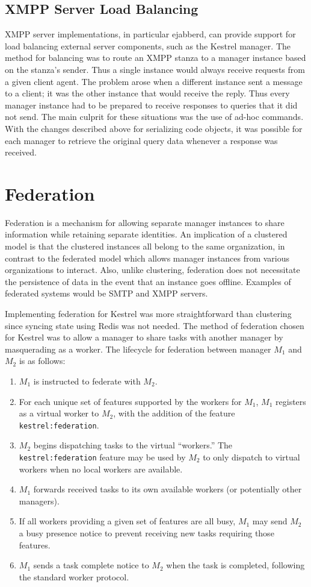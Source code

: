 \subsection{XMPP Server Load Balancing}
XMPP server implementations, in particular ejabberd, can provide support for load
balancing external server components, such as the Kestrel manager. The method for
balancing was to route an XMPP stanza to a manager instance based on the stanza's
sender. Thus a single instance would always receive requests from a given client agent.
The problem arose when a different instance sent a message to a client; it was the
other instance that would receive the reply. Thus every manager instance had to be
prepared to receive responses to queries that it did not send. The main culprit
for these situations was the use of ad-hoc commands. With the changes described above
for serializing code objects, it was possible for each manager to retrieve the
original query data whenever a response was received.

\section{Federation}
Federation is a mechanism for allowing separate manager instances to share
information while retaining separate identities. An implication of a clustered
model is that the clustered instances all belong to the same organization, in
contrast to the federated model which allows manager instances from various
organizations to interact. Also, unlike clustering, federation does not
necessitate the persistence of data in the event that an instance goes
offline. Examples of federated systems would be SMTP and XMPP servers.

Implementing federation for Kestrel was more straightforward than clustering
since syncing state using Redis was not needed. The method of federation chosen
for Kestrel was to allow a manager to share tasks with another manager by
masquerading as a worker. The lifecycle for federation between manager $M_1$ and
$M_2$ is as follows:
\begin{enumerate}
\item $M_1$ is instructed to federate with $M_2$.
\item For each unique set of features supported by the workers for $M_1$,
$M_1$ registers as a virtual worker to $M_2$, with the addition of the feature
\texttt{kestrel:federation}.
\item $M_2$ begins dispatching tasks to the virtual ``workers.'' The
\texttt{kestrel:federation} feature may be used by $M_2$ to only dispatch to
virtual workers when no local workers are available.
\item $M_1$ forwards received tasks to its own available workers (or potentially other managers).
\item If all workers providing a given set of features are all busy, $M_1$ may
send $M_2$ a busy presence notice to prevent receiving new tasks requiring those
features.
\item $M_1$ sends a task complete notice to $M_2$ when the task is completed,
following the standard worker protocol.
\end{enumerate}

